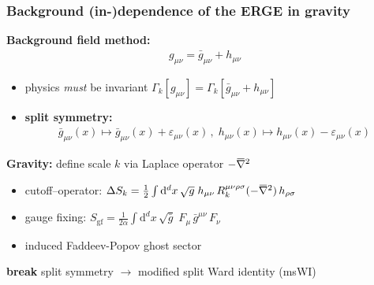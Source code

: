 \documentclass[]{beamer}  %
\newcommand{\overbar}[1]{\mkern 1.5mu\overline{\mkern-1.5mu#1\mkern-1.5mu}\mkern 1.5mu}
\newcommand{\bnabla}{\overbar \nabla}
\begin{document}
\begin{frame}
  \frametitle{Background (in-)dependence of the ERGE in gravity}
  \textbf{Background field method:}
  \begin{align*}
    \boxed{
      g_{\mu\nu} = \bar{g}_{\mu\nu} + h_{\mu\nu}
    }
  \end{align*}
  \begin{itemize}
    \item physics \textit{must} be invariant $\Gamma_k[g_{\mu\nu}] = \Gamma_k[\bar{g}_{\mu\nu} + h_{\mu\nu}]$
    \item \textbf{split symmetry:}
      \begin{align*}
        \boxed{
          \bar g_{\mu\nu}(x) \mapsto \bar g_{\mu\nu}(x) + \varepsilon_{\mu\nu}(x) \,, \;
          h_{\mu\nu}(x) \mapsto h_{\mu\nu}(x) - \varepsilon_{\mu\nu}(x)
        }
      \end{align*}
  \end{itemize}
  \pause
  \textbf{Gravity:} define scale $k$ via Laplace operator $-\bnabla^2$\\[5pt]
  \vspace{5pt}
  \begin{itemize}
    \item cutoff--operator:
      $\Delta S_k = \frac 12 \int \mathrm d^d x \, \sqrt{g} \;
      h_{\mu\nu} \, R_k^{\mu\nu\rho\sigma}(-\bnabla^2) \, h_{\rho\sigma} $\\[3pt]
    \item gauge fixing:
      $S_{\mathrm{gf}} = \frac{1}{2\alpha} \int \mathrm d^dx \, \sqrt{\bar g} \;
      F_\mu \, \bar g^{\mu\nu} \, F_\nu$\\[5pt]
    \item induced Faddeev-Popov ghost sector
  \end{itemize}
  \vspace{10pt}
  \textbf{break} split symmetry $\rightarrow$ modified split Ward identity (msWI)
\end{frame}


\end{document}
